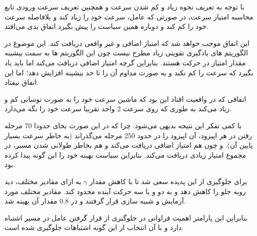 با توجه به تعریف نحوه زیاد و کم شدن سرعت و همچنین تعریف سرعت ورودی تابع محاسبه امتیاز سرعت، در صورتی که عامل، سرعت خود را زیاد کند و بلافاصله سرعت خود را کم کند و دوباره همین سیاست را پیش بگیرد اتفاق بدی می‌افتد.

این اتفاق موجب خواهد شد که امتیاز اضافی و غیر واقعی دریافت کند. این موضوع در الگوریتم های یادگیری تقویتی زیاد مطرح نیست چون این الگوریتم ها به سمت بیشینه مقدار امتیاز در حرکت هستند. بنابراین گرچه امتیاز اضافی دریافت می‌کند اما باید یاد بگیرد که سرعت را کم نکند و به صورت مداوم آن را تا حد بیشینه افزایش دهد؛ اما این اتفاق نیفتاد.



اتفاقی که در واقعیت افتاد این بود که ماشین سرعت خود را به صورت نوسانی کم و زیاد می‌کند به طوری که روی سرعت 2 واحد تقریبا سرعت خود را نگه می‌دارد. 

با کمی تفکر این نتیجه بدیهی می‌شود. چرا که در این صورت بجای حدودا 70 مرحله رفتن در هر اپیزود، آن اپیزود را در حدود 250 مرحله می‌گذراند (به خاطر سرعت بسیار پایین آن).  و چون هم امتیاز اضافی دریافت می‌کند و هم بخاطر طولانی شدن مسیر، در مجموع امتیاز زیادی دریافت می‌کند. بنابراین سیاست بهینه خود را این گونه پیدا کرده بود.

برای جلوگیری از این پدیده سعی شد تا با کاهش مقدار $\gamma$ به ازای مقادیر مختلف، دید روبه جلو را کاهش دهد و به دو و یا سه حرکت آینده محدود کند. مقادیر مختلف مورد آزمایش و شبیه سازی قرار گرفتند و در $0.8$ مقدار آن بهینه شد. 

بنابراین این پارامتر اهمیت فراوانی در جلوگیری از قرار گرفتن عامل در مسیر اشتباه دارد و با آن انتخاب از این گونه اشتباهات جلوگیری شده است.








